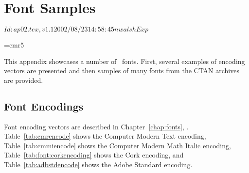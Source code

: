 \chapter{Font Samples} 
\RCSID$Id: ap02.tex,v 1.1 2002/08/23 14:58:45 nwalsh Exp $
\label{chap:fontsamples}
\label{app:fonts}

\newcount\colcount
\def\charbox{%
  \leavevmode\vbox to 16pt{%
    \vss%
    \hbox to 14pt{%
      \hss%
      \begin{tabular}{c}
        \dcr\char\colcount\\
        \tiny\number\colcount
       \end{tabular}
       \hss%
       }%
     }%
   \global\advance\colcount by 1}

\def\row{%
  \charbox&\charbox&\charbox&\charbox&\charbox&\charbox&\charbox&\charbox}

\def\colnum#1{\vbox to 0pt{\vbox to 7pt{\vfill}\vbox{\hbox{\textbf{#1}}}\vss}}

\font\tiny=cmr5
\makeatletter
\def\fontdir#1{%
  \par
  {\large\bf\it #1}
  \par
  \nopagebreak
}

\def\@fontsample[#1]#2{%
  \par
  {\normalsize\bf\it #2}
  \par
  \nobreak
  \leavevmode\hskip#1\hbox{\epsfig{figure=figs/fonts/#2.eps}}%
}

\def\@@fontsample#1{\@fontsample[1.5em]{#1}}

\def\fontsample{\@ifnextchar[{\@fontsample}{\@@fontsample}%
  }
\makeatother

This appendix showcases a number of \MF\ fonts.  First, several examples of
encoding vectors are presented and then samples of many fonts from
the CTAN archives are provided.

\section{Font Encodings}

Font encoding vectors are described in Chapter~\ref{chap:fonts},
\textit{}.  Table~\ref{tab:cmrencode} shows
the Computer Modern Text encoding,  Table~\ref{tab:cmmiencode} shows
the Computer Modern Math Italic encoding,  Table~\ref{tab:font:corkencoding}
shows the Cork encoding, and Table~\ref{tab:adbstdencode} shows the
Adobe Standard encoding.

